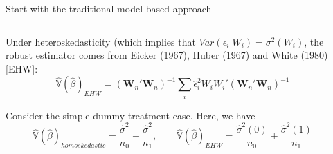 \documentclass[notes,11pt, aspectratio=169]{beamer}
\newenvironment{wideitemize}{\itemize\addtolength{\itemsep}{10pt}}{\enditemize}
\begin{document}
\begin{frame}{Start with the traditional model-based approach}
\begin{columns}[T] %
\begin{column}{.8\textwidth}
  \begin{wideitemize}
  \item Under heteroskedasticity (which implies that $Var(\epsilon_{i} | W_{i}) = \sigma^{2}(W_{i})$, the robust estimator comes from Eicker (1967), Huber (1967) and White (1980) [EHW]:
    \begin{equation*}
      \hat{\mathbb{V}}(\hat{\beta})_{EHW} = (\mathbf{W}_{n}'\mathbf{W}_{n})^{-1}\sum_{i}\hat{\epsilon}_{i}^{2}W_{i}W_{i}'(\mathbf{W}_{n}'\mathbf{W}_{n})^{-1}
    \end{equation*}
  \item Consider the simple dummy treatment case. Here, we have
    \begin{equation*}
           \hat{\mathbb{V}}(\hat{\beta})_{homoskedastic} = \frac{\hat{\sigma}^{2}}{n_{0}} + \frac{\hat{\sigma}^{2}}{n_{1}}, \qquad \hat{\mathbb{V}}(\hat{\beta})_{EHW} = \frac{\hat{\sigma}^{2}(0)}{n_{0}} + \frac{\hat{\sigma}^{2}(1)}{n_{1}}
         \end{equation*}
  \end{wideitemize}
  \end{column}%
  \hfill%
  \begin{column}{.5\textwidth}
  \end{column}
\end{columns}
  
\end{frame}
\end{document}
